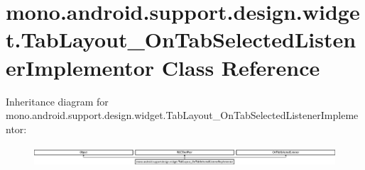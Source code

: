\hypertarget{classmono_1_1android_1_1support_1_1design_1_1widget_1_1_tab_layout___on_tab_selected_listener_implementor}{}\section{mono.\+android.\+support.\+design.\+widget.\+Tab\+Layout\+\_\+\+On\+Tab\+Selected\+Listener\+Implementor Class Reference}
\label{classmono_1_1android_1_1support_1_1design_1_1widget_1_1_tab_layout___on_tab_selected_listener_implementor}
Inheritance diagram for mono.\+android.\+support.\+design.\+widget.\+Tab\+Layout\+\_\+\+On\+Tab\+Selected\+Listener\+Implementor\+:\begin{figure}[H]
\begin{center}
\leavevmode
\includegraphics[height=0.757268cm]{classmono_1_1android_1_1support_1_1design_1_1widget_1_1_tab_layout___on_tab_selected_listener_implementor}
\end{center}
\end{figure}
